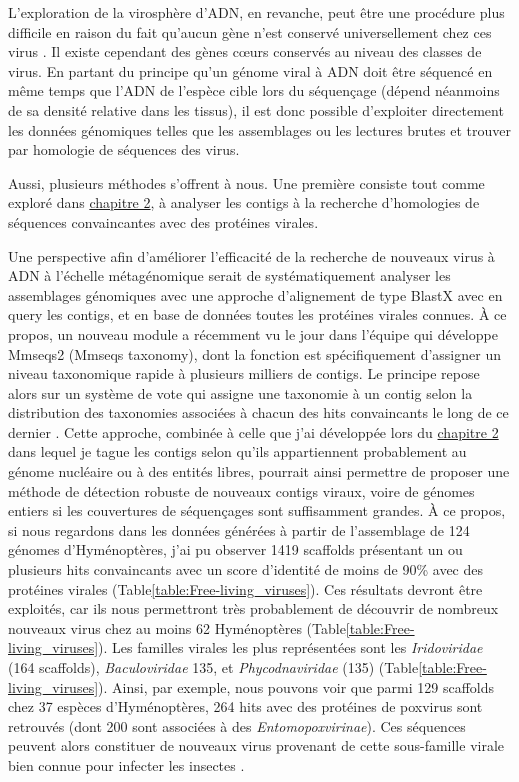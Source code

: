 L'exploration de la virosphère d'ADN, en revanche, peut être une procédure plus difficile en raison du fait qu'aucun gène n'est conservé universellement chez ces virus \citep{iranzo_double-stranded_2016}. Il existe cependant des gènes cœurs conservés au niveau des classes de virus. En partant du principe qu'un génome viral à ADN doit être séquencé en même temps que l'ADN de l'espèce cible lors du séquençage (dépend néanmoins de sa densité relative dans les tissus), il est donc possible d'exploiter directement les données génomiques telles que les assemblages ou les lectures brutes et trouver par homologie de séquences des virus. 

Aussi, plusieurs méthodes s'offrent à nous. Une première consiste tout comme exploré dans \hyperref[sec:chap2]{chapitre 2}, à analyser les contigs à la recherche d'homologies de séquences convaincantes avec des protéines virales.

Une perspective afin d'améliorer l'efficacité de la recherche de nouveaux virus à ADN à l'échelle métagénomique serait de systématiquement analyser les assemblages génomiques avec une approche d'alignement de type BlastX avec en query les contigs, et en base de données toutes les protéines virales connues. À ce propos, un nouveau module a récemment vu le jour dans l'équipe qui développe Mmseqs2 (Mmseqs taxonomy), dont la fonction est spécifiquement d'assigner un niveau taxonomique rapide à plusieurs milliers de contigs. Le principe repose alors sur un système de vote qui assigne une taxonomie à un contig selon la distribution des taxonomies associées à chacun des hits convaincants le long de ce dernier \citep{mirdita_fast_2021}. Cette approche, combinée à celle que j'ai développée lors du \hyperref[sec:chap2]{chapitre 2} dans lequel je tague les contigs selon qu'ils appartiennent probablement au génome nucléaire ou à des entités libres, pourrait ainsi permettre de proposer une méthode de détection robuste de nouveaux contigs viraux, voire de génomes entiers si les couvertures de séquençages sont suffisamment grandes. À ce propos, si nous regardons dans les données générées à partir de l'assemblage de 124 génomes d'Hyménoptères, j'ai pu observer 1419 scaffolds présentant un ou plusieurs hits convaincants avec un score d'identité de moins de 90\% avec des protéines virales (Table\ref{table:Free-living_viruses}). Ces résultats devront être exploités, car ils nous permettront très probablement de découvrir de nombreux nouveaux virus chez au moins 62 Hyménoptères (Table\ref{table:Free-living_viruses}). Les familles virales les plus représentées sont les \textit{Iridoviridae} (164 scaffolds), \textit{Baculoviridae} {135}, et \textit{Phycodnaviridae} (135) (Table\ref{table:Free-living_viruses}). Ainsi, par exemple, nous pouvons voir que parmi 129 scaffolds chez 37 espèces d'Hyménoptères, 264 hits avec des protéines de poxvirus sont retrouvés (dont 200 sont associées à des \textit{Entomopoxvirinae}). Ces séquences peuvent alors constituer de nouveaux virus provenant de cette sous-famille virale bien connue pour infecter les insectes \citep{theze_new_2013}.



